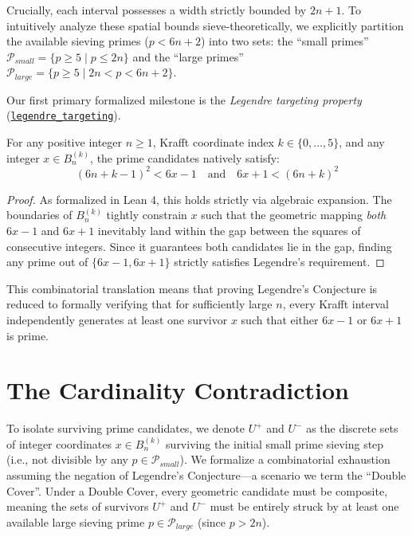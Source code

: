 \documentclass[lean]{AFM}
\renewcommand{\.}{\hskip .75pt}
\def\urlpfx{https://github.com/ElNando888/KrafftSieve/blob/main}
\begin{document}
Crucially, each interval possesses a width strictly bounded by $2n+1$. To intuitively analyze these
spatial bounds sieve-theoretically, we explicitly partition the available sieving primes
($p < 6n+2$) into two sets: the ``small primes'' $\mathcal{P}_{small} = \{ p \ge 5 \mid p \le 2n\}$
and the ``large primes'' $\mathcal{P}_{large} = \{ p \ge 5 \mid 2n < p < 6n+2\}$. 

Our first primary formalized milestone is the \textit{Legendre targeting property} 
(\href{\urlpfx/Legendre/KrafftIntervals.lean#L87}{\texttt{legendre\allowbreak \_targeting}}).

\begin{theorem}
For any positive integer $n \ge 1$, Krafft coordinate index $k \in \{0,\dots,5\}$, and any integer
$x \in B_n^{(k)}$, the prime candidates natively satisfy:
$$ (6n + k - 1)^2 < 6x - 1 \quad \text{and} \quad 6x + 1 < (6n + k)^2 $$
\end{theorem}
\begin{proof}
As formalized in Lean 4, this holds strictly via algebraic expansion. The boundaries of
$B_n^{(k)}$ tightly constrain $x$ such that the geometric mapping \textit{both} $6x - 1$ and
$6x + 1$ inevitably land within the gap between the squares of consecutive integers. Since it
guarantees both candidates lie in the gap, finding any prime out of $\{6x-1, 6x+1\}$ strictly
satisfies Legendre's requirement.
\end{proof}

This combinatorial translation means that proving Legendre's Conjecture is reduced to formally
verifying that for sufficiently large $n$, every Krafft interval independently generates at least
one survivor $x$ such that either $6x-1$ or $6x+1$ is prime.

\section{The Cardinality Contradiction} \label{contradiction_scaffold}

To isolate surviving prime candidates, we denote $U^+$ and $U^-$ as the discrete sets of integer
coordinates $x \in B_n^{(k)}$ surviving the initial small prime sieving step (i.e., not divisible
by any $p \in \mathcal{P}_{small}$). We formalize a combinatorial exhaustion assuming the
negation of Legendre's Conjecture---a scenario we term the ``Double Cover''. Under a Double
Cover, every geometric candidate must be composite, meaning the sets of survivors $U^+$ and $U^-$
must be entirely struck by at least one available large sieving prime $p \in \mathcal{P}_{large}$
(since $p > 2n$).
\end{document}

